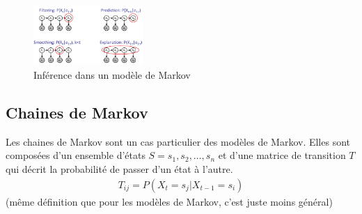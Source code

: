 \begin{figure}[H]
\begin{center}
        \includegraphics[width=0.37\textwidth]{../pictures/inferencehmm.png}
    \end{center}
    \caption{Inférence dans un modèle de Markov}\label{fig:inferencehmm}
\end{figure}


\subsection{Chaines de Markov} %
\label{sub:chaines_de_markov}

Les chaines de Markov sont un cas particulier des modèles de Markov. 
Elles sont composées d'un ensemble d'états $S = {s_1, s_2, \dots, s_n}$ et d'une matrice de transition 
$T$ qui décrit la probabilité de passer d'un état à l'autre.
\begin{align*}
    T_{ij} = P(X_t = s_j | X_{t-1} = s_i) 
\end{align*} 
(même définition que pour les modèles de Markov, c'est juste moins général)







